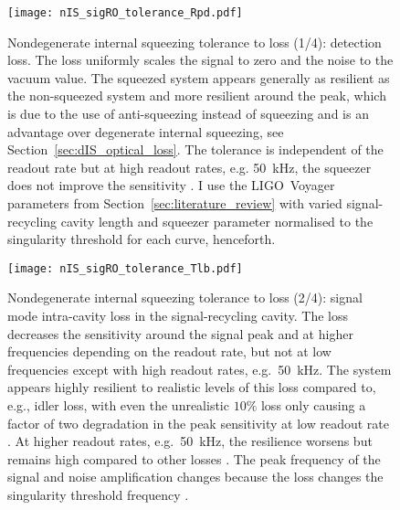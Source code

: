 \begin{figure}
    \centering
    \texttt{[image: nIS\_sigRO\_tolerance\_Rpd.pdf]}
    \caption{  Nondegenerate internal squeezing tolerance to loss (1/4): detection loss. The loss uniformly scales the signal to zero and the noise to the vacuum value. The squeezed system appears generally as resilient as the non-squeezed system and more resilient around the peak, which is due to the use of anti-squeezing instead of squeezing and is an advantage over degenerate internal squeezing, see Section~\ref{sec:dIS_optical_loss}. The tolerance is independent of the readout rate but at high readout rates, e.g. 50~kHz, the squeezer does not improve the sensitivity . I use the LIGO~Voyager parameters from Section~\ref{sec:literature_review} with varied signal-recycling cavity length  and squeezer parameter normalised to the singularity threshold for each curve, henceforth.}
    \label{fig:nIS_sigRO_tolerance_Rpd}
\end{figure}
\begin{figure}
    \centering
    \texttt{[image: nIS\_sigRO\_tolerance\_Tlb.pdf]}
    \caption{  Nondegenerate internal squeezing tolerance to loss (2/4): signal mode intra-cavity loss in the signal-recycling cavity. The loss decreases the sensitivity around the signal peak and at higher frequencies depending on the readout rate, but not at low frequencies except with high readout rates, e.g.\ 50~kHz. The system appears highly resilient to realistic levels of this loss compared to, e.g., idler loss, with even the unrealistic $10\%$ loss only causing a factor of two degradation in the peak sensitivity at low readout rate . At higher readout rates, e.g.\ 50~kHz, the resilience worsens but remains high compared to other losses . The peak frequency of the signal and noise amplification changes because the loss changes the singularity threshold frequency .}
    \label{fig:nIS_sigRO_tolerance_Tlb}
\end{figure}
